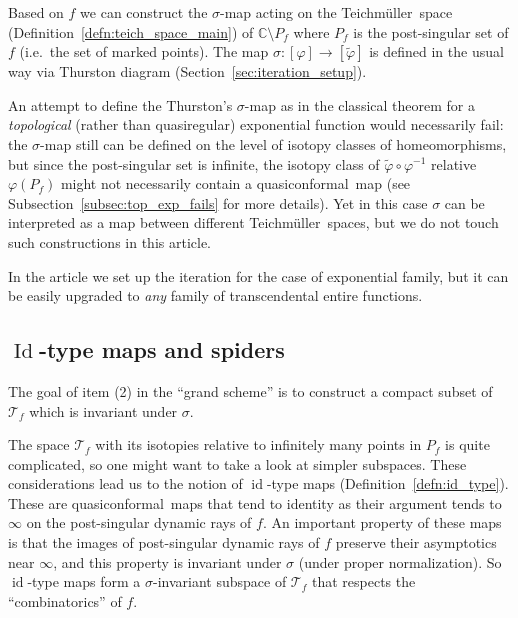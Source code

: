\documentclass[10pt,reqno,a4paper]{amsart}
\numberwithin{figure}{section}
\numberwithin{equation}{section}
\newcommand{\tei}{Teichm\"uller}
\newcommand{\qc}{quasiconformal}
\newcommand{\id}{\operatorname{id}}
\newcommand{\Id}{\operatorname{Id}}
\begin{document}
Based on $f$ we can construct the $\sigma$-map acting on the \tei\ space (Definition~\ref{defn:teich_space_main}) of $\mathbb{C}\setminus P_f$ where $P_f$ is the post-singular set of $f$ (i.e.\ the set of marked points). The map $\sigma:[\varphi]\to[\tilde{\varphi}]$ is defined in the usual way via Thurston diagram (Section~\ref{sec:iteration_setup}).

\begin{center}
\end{center}
\vspace{0.5cm}

An attempt to define the Thurston's $\sigma$-map as in the classical theorem for a \emph{topological} (rather than quasiregular) exponential function would necessarily fail: the $\sigma$-map still can be defined on the level of isotopy classes of homeomorphisms, but since the post-singular set is infinite, the isotopy class of $\tilde{\varphi}\circ\varphi^{-1}$ relative $\varphi(P_f)$ might not necessarily contain a \qc\ map (see Subsection~\ref{subsec:top_exp_fails} for more details). Yet in this case $\sigma$ can be interpreted as a map between different \tei\ spaces, but we do not touch such constructions in this article.

In the article we set up the iteration for the case of exponential family, but it can be easily upgraded to \emph{any} family of transcendental entire functions.

\subsection*{$\Id$-type maps and spiders}

The goal of item (2) in the ``grand scheme'' is to construct a compact subset of $\mathcal{T}_f$ which is invariant under $\sigma$.

The space $\mathcal{T}_f$ with its isotopies relative to infinitely many points in $P_f$ is quite complicated, so one might want to take a look at simpler subspaces. These considerations lead us to the notion of $\id$-type maps (Definition~\ref{defn:id_type}). These are \qc\ maps that tend to identity as their argument tends to $\infty$ on the post-singular dynamic rays of $f$. An important property of these maps is that the images of post-singular dynamic rays of $f$ preserve their asymptotics near $\infty$, and this property is invariant under $\sigma$ (under proper normalization). So $\id$-type maps form a $\sigma$-invariant subspace of $\mathcal{T}_f$ that respects the ``combinatorics'' of $f$.
\end{document}
